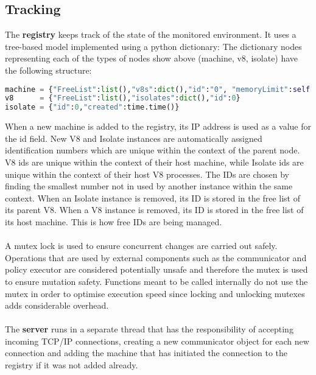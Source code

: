 \documentclass{l4proj}
\begin{document}
\subsection{Tracking}
\hspace*{3em} The \textbf{registry} keeps track of the state of the monitored environment. It uses a tree-based model implemented using a python dictionary:
The dictionary nodes representing each of the types of nodes show above (machine, v8, isolate) have the following structure: 
\begin{lstlisting}[language=python]
machine = {"FreeList":list(),"v8s":dict(),"id":"0", "memoryLimit":self.newMachineMemLimit}
v8      = {"FreeList":list(),"isolates":dict(),"id":0}
isolate = {"id":0,"created":time.time()}
\end{lstlisting}
\hspace*{3em} When a new machine is added to the registry, its IP address is used as a value for the id field. New V8 and Isolate instances are automatically assigned identification numbers which are unique within the context of the parent node. V8 ids are unique within the context of their host machine, while Isolate ids are unique within the context of their host V8 processes. The IDs are chosen by finding the smallest number not in used by another instance within the same context. When an Isolate instance is removed, its ID is stored in the free list of its parent V8. When a V8 instance is removed, its ID is stored in the free list of its host machine. This is how free IDs are being managed.
\\\\
\hspace*{3em} A mutex lock is used to ensure concurrent changes are carried out safely. Operations that are used by external components such as the communicator and policy executor are considered potentially unsafe and therefore the mutex is used to ensure mutation safety. Functions meant to be called internally do not use the mutex in order to optimise execution speed since locking and unlocking mutexes adds considerable overhead.
\\\\
\hspace*{3em} The \textbf{server} runs in a separate thread that has the responsibility of accepting incoming TCP/IP connections, creating a new communicator object for each new connection and adding the machine that has initiated the connection to the registry if it was not added already.
\end{document}
